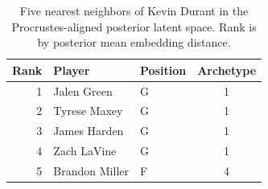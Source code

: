 \begin{table}[htbp]
  \centering\small
  \begin{tabular}{rllc}
    \toprule
    Rank & Player & Position & Archetype \\
    \midrule
    1 & Jalen Green & G & 1 \\
    2 & Tyrese Maxey & G & 1 \\
    3 & James Harden & G & 1 \\
    4 & Zach LaVine & G & 1 \\
    5 & Brandon Miller & F & 4 \\
    \bottomrule
  \end{tabular}
  \caption{Five nearest neighbors of Kevin Durant in the Procrustes-aligned posterior latent space. Rank is by posterior mean embedding distance.}
  \label{tab:Kevin_Durant_neighbors}
\end{table}


